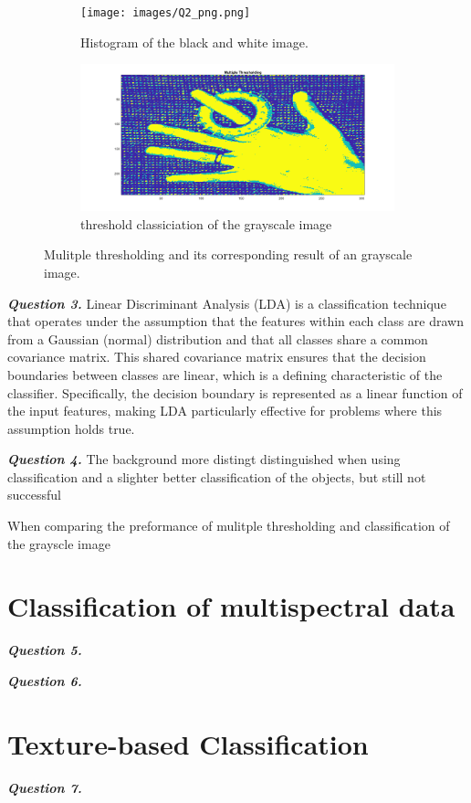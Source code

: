 \documentclass[12pt]{article}
\begin{document}
\begin{figure}[h!]
  \begin{subfigure}[b]{0.5\textwidth}
       \centering
       \texttt{[image: images/Q2\_png.png]}
       \caption{Histogram of the black and white image.}
       \label{fig:Q2_hist}
   \end{subfigure}
   \hfill
   \begin{subfigure}[b]{0.5\textwidth}
       \centering
       \includegraphics[width=0.9\linewidth]{images/Q2.png}
       \caption{threshold classiciation of the grayscale image}
       \label{fig:Q2_im}
   \end{subfigure}
      \caption{Mulitple thresholding and its corresponding result of an grayscale image.}
      \label{fig:Q2}
\end{figure}


\textbf{\emph{Question 3.}}
Linear Discriminant Analysis (LDA) is a classification technique that operates under the assumption that the features within each class are drawn from a Gaussian (normal) distribution and that all classes share a common covariance matrix. This shared covariance matrix ensures that the decision boundaries between classes are linear, which is a defining characteristic of the classifier. Specifically, the decision boundary is represented as a linear function of the input features, making LDA particularly effective for problems where this assumption holds true.

\textbf{\emph{Question 4.}}
The background more distingt distinguished when using classification and a slighter better classification of the objects, but still not successful

When comparing the preformance of mulitple thresholding and classification of the grayscle image
\section{Classification of multispectral data}
\textbf{\emph{Question 5.}}

\textbf{\emph{Question 6.}}

\section{Texture-based Classification}
\textbf{\emph{Question 7.}}
\end{document}
